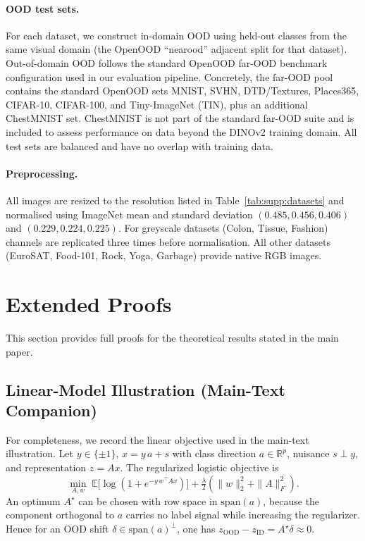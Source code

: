 \documentclass[runningheads]{llncs}
\newcommand{\tabref}[1]{Table~\ref{#1}}
\begin{document}
\paragraph{OOD test sets.}
For each dataset, we construct in-domain OOD using held-out classes from the same visual domain
(the OpenOOD ``nearood'' adjacent split for that dataset). Out-of-domain OOD follows the standard
OpenOOD far-OOD benchmark configuration used in our evaluation pipeline. Concretely, the far-OOD
pool contains the standard OpenOOD sets MNIST, SVHN, DTD/Textures, Places365, CIFAR-10,
CIFAR-100, and Tiny-ImageNet (TIN), plus an additional ChestMNIST set. ChestMNIST is not part of
the standard far-OOD suite and is included to assess performance on data beyond the DINOv2 training
domain. All test sets are balanced and have no overlap with training data.

\paragraph{Preprocessing.}
All images are resized to the resolution listed in \tabref{tab:supp:datasets} and
normalised using ImageNet mean and standard deviation $(0.485,0.456,0.406)$ and
$(0.229,0.224,0.225)$.  For greyscale datasets (Colon, Tissue, Fashion) channels are
replicated three times before normalisation.  All other datasets (EuroSAT, Food-101, Rock,
Yoga, Garbage) provide native RGB images.



\section{Extended Proofs}
\label{sec:supp:proofs}

This section provides full proofs for the theoretical results stated in the main paper.

\subsection{Linear-Model Illustration (Main-Text Companion)}
\label{sec:supp:toy-linear}

For completeness, we record the linear objective used in the main-text illustration.
Let $y \in \{\pm 1\}$, $x = y\,a + s$ with class direction $a \in \mathbb{R}^p$, nuisance $s \perp y$, and representation $z = Ax$.
The regularized logistic objective is
\begin{equation}
  \min_{A,w}\;\mathbb{E}\bigl[\log(1 + e^{-y\,w^\top\!Ax})\bigr] + \tfrac{\lambda}{2}(\|w\|_2^2 + \|A\|_F^2).
  \label{eq:supp:toy-loss}
\end{equation}
An optimum $A^\star$ can be chosen with row space in $\mathrm{span}(a)$, because the component orthogonal to $a$ carries no label signal while increasing the regularizer.
Hence for an OOD shift $\delta \in \mathrm{span}(a)^\perp$, one has $z_{\mathrm{OOD}} - z_{\mathrm{ID}} = A^\star\delta \approx 0$.
\end{document}
